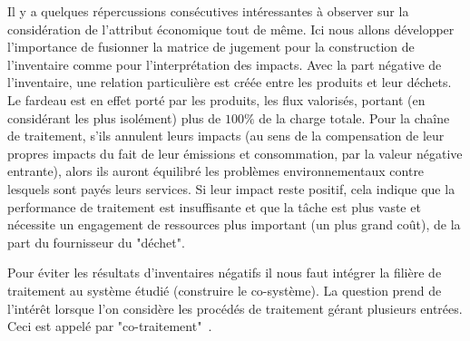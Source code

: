 Il y a quelques répercussions consécutives intéressantes à observer sur la considération de l'attribut économique tout de même.
Ici nous allons développer l'importance de fusionner la matrice de jugement pour la construction de l'inventaire comme pour l'interprétation des impacts.
Avec la part négative de l'inventaire, une relation particulière est créée entre les produits et leur déchets.
Le fardeau est en effet porté par les produits, les flux valorisés, portant (en considérant les plus isolément) plus de $100 \%$ de la charge totale.
Pour la chaîne de traitement, s'ils annulent leurs impacts (au sens de la compensation de leur propres impacts du fait de leur émissions et consommation, par la valeur négative entrante), alors ils auront équilibré les problèmes environnementaux contre lesquels sont payés leurs services.
Si leur impact reste positif, cela indique que la performance de traitement est insuffisante et que la tâche est plus vaste et nécessite un engagement de ressources plus important (un plus grand coût), de la part du fournisseur du "déchet".

Pour éviter les résultats d'inventaires négatifs il nous faut intégrer la filière de traitement au système étudié (construire le co-système).
La question prend de l'intérêt lorsque l'on considère les procédés de traitement gérant plusieurs entrées.
Ceci est appelé par \citeauthor{schneider_analyse_1998} "co-traitement"~\cite{schneider_analyse_1998}.



